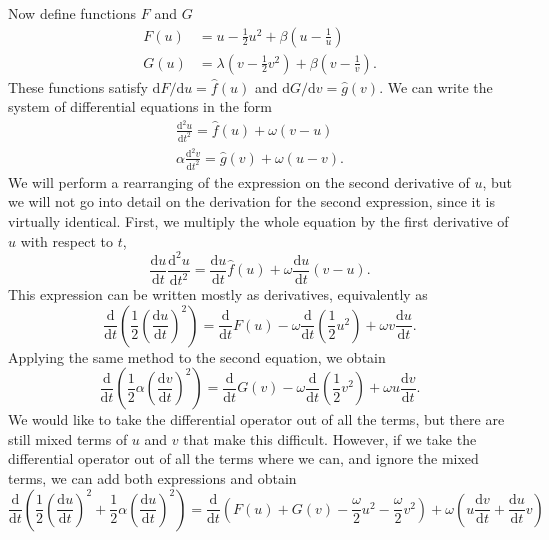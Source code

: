 \documentclass{report}
\begin{document}
Now define functions $F$ and $G$
\begin{align*}
    F(u) &= u - \frac{1}{2}u^2 + \beta\left(u - \frac{1}{u} \right) \\
    G(u) &= \lambda\left( v - \frac{1}{2}v^2 \right) + \beta\left( v - \frac{1}{v}\right).
\end{align*}
These functions satisfy \(\mathrm{d}F/\mathrm{d}u = \hat{f}(u)\) and \(\mathrm{d}G/\mathrm{d}v = \hat{g}(v)\).
We can write the system of differential equations in the form
\begin{align*}
    \frac{\mathrm{d}^2 u}{\mathrm{d}t^2} = \hat{f}(u) + \omega(v-u) \\
    \alpha\frac{\mathrm{d}^2 v}{\mathrm{d}t^2} = \hat{g}(v) + \omega(u-v).
\end{align*}
We will perform a rearranging of the expression on the second derivative of $u$,
but we will not go into detail on the derivation for the second expression,
since it is virtually identical.
First, we multiply the whole equation by the first derivative of $u$ with respect to $t$,
\begin{equation*}
    \frac{\mathrm{d}u}{\mathrm{d}t}\frac{\mathrm{d}^2 u}{\mathrm{d}t^2} = \frac{\mathrm{d}u}{\mathrm{d}t}\hat{f}(u) + \omega \frac{\mathrm{d}u}{\mathrm{d}t}(v-u).
\end{equation*}
This expression can be written mostly as derivatives, equivalently as
\begin{equation*}
    \frac{\mathrm{d}}{\mathrm{d}t}\left(
        \frac{1}{2}\left(\frac{\mathrm{d}u}{\mathrm{d}t}\right)^2
     \right) = \frac{\mathrm{d}}{\mathrm{d}t}F(u) - \omega\frac{\mathrm{d}}{\mathrm{d}t}\left(\frac{1}{2}u^2\right) + \omega v \frac{\mathrm{d}u}{\mathrm{d}t}.
\end{equation*}
Applying the same method to the second equation, we obtain
\begin{equation*}
    \frac{\mathrm{d}}{\mathrm{d}t}\left(
        \frac{1}{2}\alpha\left(\frac{\mathrm{d}v}{\mathrm{d}t}\right)^2
    \right) = \frac{\mathrm{d}}{\mathrm{d}t}G(v) - \omega\frac{\mathrm{d}}{\mathrm{d}t}\left( \frac{1}{2}v^2 \right) + \omega u \frac{\mathrm{d}v}{\mathrm{d}t}.
\end{equation*}
We would like to take the differential operator out of all the terms, but there are still mixed terms of $u$ and $v$ that make this difficult.
However, if we take the differential operator out of all the terms where we can, and ignore the mixed terms, we can add both expressions and obtain
\begin{equation*}
    \frac{\mathrm{d}}{\mathrm{d}t}\left(
        \frac{1}{2}\left(\frac{\mathrm{d}u}{\mathrm{d}t}\right)^2 + \frac{1}{2}\alpha\left(\frac{\mathrm{d}u}{\mathrm{d}t}\right)^2
    \right) = \frac{\mathrm{d}}{\mathrm{d}t}\left(
        F(u) + G(v) - \frac{\omega}{2}u^2 -\frac{\omega}{2}v^2
    \right) + \omega \left(
        u \frac{\mathrm{d}v}{\mathrm{d}t} + \frac{\mathrm{d}u}{\mathrm{d}t}v
    \right)
\end{equation*}
\end{document}
